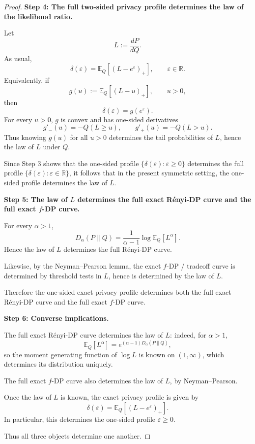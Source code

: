 \documentclass[11pt]{article}
\begin{document}
\begin{proof}
\medskip
\noindent
\textbf{Step 4: The full two-sided privacy profile determines the law of the likelihood ratio.}

Let
\[
L:=\frac{dP}{dQ}.
\]
As usual,
\[
\delta(\varepsilon)=\mathbb E_Q[(L-e^\varepsilon)_+],\qquad \varepsilon\in\mathbb R.
\]
Equivalently, if
\[
g(u):=\mathbb E_Q[(L-u)_+],\qquad u>0,
\]
then
\[
\delta(\varepsilon)=g(e^\varepsilon).
\]
For every \(u>0\), \(g\) is convex and has one-sided derivatives
\[
g'_-(u)=-Q(L\ge u),\qquad g'_+(u)=-Q(L>u).
\]
Thus knowing \(g(u)\) for all \(u>0\) determines the tail probabilities of \(L\), hence the law of \(L\) under \(Q\).

Since Step 3 shows that the one-sided profile \(\{\delta(\varepsilon):\varepsilon\ge 0\}\) determines the full profile \(\{\delta(\varepsilon):\varepsilon\in\mathbb R\}\), it follows that in the present symmetric setting, the one-sided profile determines the law of \(L\).

\medskip
\noindent
\textbf{Step 5: The law of \(L\) determines the full exact R\'enyi-DP curve and the full exact \(f\)-DP curve.}

For every \(\alpha>1\),
\[
D_\alpha(P\|Q)=\frac{1}{\alpha-1}\log \mathbb E_Q[L^\alpha].
\]
Hence the law of \(L\) determines the full R\'enyi-DP curve.

Likewise, by the Neyman--Pearson lemma, the exact \(f\)-DP / tradeoff curve is determined by threshold tests in \(L\), hence is determined by the law of \(L\).

Therefore the one-sided exact privacy profile determines both the full exact R\'enyi-DP curve and the full exact \(f\)-DP curve.

\medskip
\noindent
\textbf{Step 6: Converse implications.}

The full exact R\'enyi-DP curve determines the law of \(L\): indeed, for \(\alpha>1\),
\[
\mathbb E_Q[L^\alpha]=e^{(\alpha-1)D_\alpha(P\|Q)},
\]
so the moment generating function of \(\log L\) is known on \((1,\infty)\), which determines its distribution uniquely.

The full exact \(f\)-DP curve also determines the law of \(L\), by Neyman--Pearson.

Once the law of \(L\) is known, the exact privacy profile is given by
\[
\delta(\varepsilon)=\mathbb E_Q[(L-e^\varepsilon)_+].
\]
In particular, this determines the one-sided profile \(\varepsilon\ge 0\).

Thus all three objects determine one another.
\end{proof}
\end{document}
